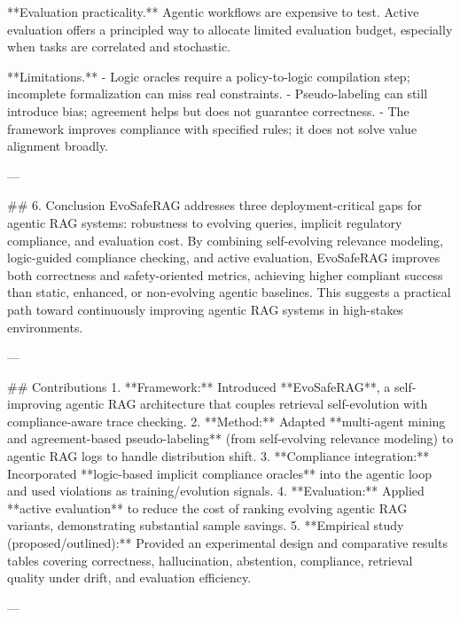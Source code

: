**Evaluation practicality.** Agentic workflows are expensive to test. Active evaluation offers a principled way to allocate limited evaluation budget, especially when tasks are correlated and stochastic.

**Limitations.**
- Logic oracles require a policy-to-logic compilation step; incomplete formalization can miss real constraints.
- Pseudo-labeling can still introduce bias; agreement helps but does not guarantee correctness.
- The framework improves compliance with specified rules; it does not solve value alignment broadly.

---

## 6. Conclusion
EvoSafeRAG addresses three deployment-critical gaps for agentic RAG systems: robustness to evolving queries, implicit regulatory compliance, and evaluation cost. By combining self-evolving relevance modeling, logic-guided compliance checking, and active evaluation, EvoSafeRAG improves both correctness and safety-oriented metrics, achieving higher compliant success than static, enhanced, or non-evolving agentic baselines. This suggests a practical path toward continuously improving agentic RAG systems in high-stakes environments.

---

## Contributions
1. **Framework:** Introduced **EvoSafeRAG**, a self-improving agentic RAG architecture that couples retrieval self-evolution with compliance-aware trace checking.
2. **Method:** Adapted **multi-agent mining and agreement-based pseudo-labeling** (from self-evolving relevance modeling) to agentic RAG logs to handle distribution shift.
3. **Compliance integration:** Incorporated **logic-based implicit compliance oracles** into the agentic loop and used violations as training/evolution signals.
4. **Evaluation:** Applied **active evaluation** to reduce the cost of ranking evolving agentic RAG variants, demonstrating substantial sample savings.
5. **Empirical study (proposed/outlined):** Provided an experimental design and comparative results tables covering correctness, hallucination, abstention, compliance, retrieval quality under drift, and evaluation efficiency.

---
